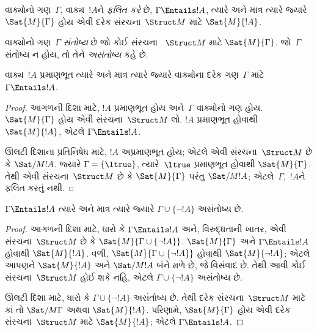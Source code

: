 \begin{defn}[ફલિતતા]
વાક્યોનો ગણ~$\Gamma$, વાક્ય~$!A$ને \emph{ફલિત કરે} છે,
$\Gamma\Entails !A$, ત્યારે અને માત્ર ત્યારે જ્યારે
$\Sat{M}{\Gamma}$ હોય એવી દરેક સંરચના~$\Struct M$ માટે
$\Sat{M}{!A}$.
\end{defn}


\begin{defn}[સંતોષ્યતા]
વાક્યોનો ગણ~$\Gamma$ \emph{સંતોષ્ય} છે જો કોઈ સંરચના
~$\Struct M$ માટે $\Sat{M}{\Gamma}$. જો~$\Gamma$ સંતોષ્ય ન હોય, તો તેને
\emph{અસંતોષ્ય} કહે છે.
\end{defn}

\begin{prop}
વાક્ય~$!A$ પ્રમાણભૂત ત્યારે અને માત્ર ત્યારે જ્યારે વાક્યોના દરેક
ગણ~$\Gamma$ માટે $\Gamma\Entails !A$.
\end{prop}

\begin{proof}
આગળની દિશા માટે, $!A$ પ્રમાણભૂત હોય અને~$\Gamma$ વાક્યોનો ગણ હોય.
$\Sat{M}{\Gamma}$ હોય એવી સંરચના~$\Struct M$ લો. $!A$
પ્રમાણભૂત હોવાથી $\Sat{M}{!A}$, એટલે $\Gamma\Entails !A$.

ઊલટી દિશાના પ્રતિનિષેધ માટે, $!A$ અપ્રમાણભૂત હોય; એટલે એવી
સંરચના~$\Struct M$ છે કે $\Sat/{M}{!A}$. જ્યારે
$\Gamma=\{\ltrue\}$, ત્યારે~$\ltrue$ પ્રમાણભૂત હોવાથી
$\Sat{M}{\Gamma}$. તેથી એવી સંરચના~$\Struct M$ છે કે
$\Sat{M}{\Gamma}$ પરંતુ $\Sat/{M}{!A}$; એટલે~$\Gamma$,~$!A$ને ફલિત
કરતું નથી.
\end{proof}

\begin{prop}
$\Gamma\Entails !A$ ત્યારે અને માત્ર ત્યારે જ્યારે
$\Gamma\cup\{\lnot !A\}$ અસંતોષ્ય છે.
\end{prop}

\begin{proof}
આગળની દિશા માટે, ધારો કે $\Gamma\Entails !A$ અને, વિરુદ્ધતાની ખાતર,
એવી સંરચના~$\Struct M$ છે કે
$\Sat{M}{\Gamma\cup\{\lnot !A\}}$. $\Sat{M}{\Gamma}$ અને
$\Gamma\Entails !A$ હોવાથી $\Sat{M}{!A}$. વળી,
$\Sat{M}{\Gamma\cup\{\lnot !A\}}$ હોવાથી $\Sat{M}{\lnot !A}$; એટલે
આપણને $\Sat{M}{!A}$ અને $\Sat/{M}{!A}$ બંને મળે છે, જે વિસંવાદ છે.
તેથી આવી કોઈ સંરચના~$\Struct M$ હોઈ શકે નહિ, એટલે
$\Gamma\cup\{\lnot !A\}$ અસંતોષ્ય છે.

ઊલટી દિશા માટે, ધારો કે $\Gamma\cup\{\lnot !A\}$ અસંતોષ્ય છે. તેથી
દરેક સંરચના~$\Struct M$ માટે કાં તો $\Sat/{M}{\Gamma}$ અથવા
$\Sat{M}{!A}$. પરિણામે, $\Sat{M}{\Gamma}$ હોય એવી દરેક
સંરચના~$\Struct M$ માટે $\Sat{M}{!A}$; એટલે
$\Gamma\Entails !A$.
\end{proof}

